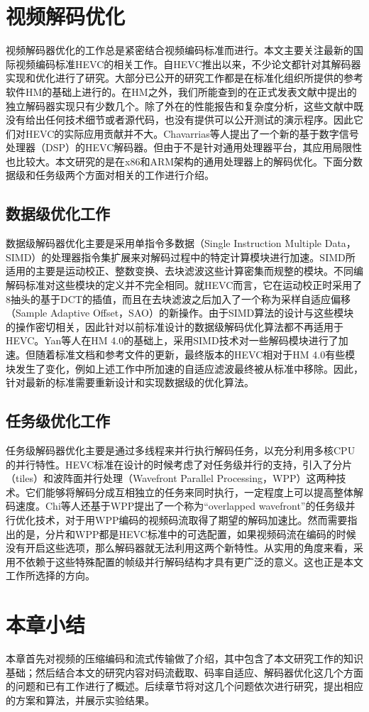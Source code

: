 \section{视频解码优化}

视频解码器优化的工作总是紧密结合视频编码标准而进行。本文主要关注最新的国际视频编码标准HEVC的相关工作。自HEVC推出以来，不少论文都针对其解码器实现和优化进行了研究。大部分已公开的研究工作都是在标准化组织所提供的参考软件HM\supercite{HM}的基础上进行的。在HM之外，我们所能查到的在正式发表文献中提出的独立解码器实现只有少数几个\supercite{Bossen-TCSVT2012,JCTVC-G988,JCTVC-H0693}。除了外在的性能报告和复杂度分析，这些文献中既没有给出任何技术细节或者源代码，也没有提供可以公开测试的演示程序。因此它们对HEVC的实际应用贡献并不大。Chavarrias等人\supercite{Chavarrias-TCE2013}提出了一个新的基于数字信号处理器（DSP）的HEVC解码器。但由于不是针对通用处理器平台，其应用局限性也比较大。本文研究的是在x86和ARM架构的通用处理器上的解码优化。下面分数据级和任务级两个方面对相关的工作进行介绍。

\subsection{数据级优化工作}

数据级解码器优化主要是采用单指令多数据（Single Instruction Multiple Data，SIMD）的处理器指令集扩展来对解码过程中的特定计算模块进行加速。SIMD所适用的主要是运动校正、整数变换、去块滤波这些计算密集而规整的模块。不同编解码标准对这些模块的定义并不完全相同。就HEVC而言，它在运动校正时采用了8抽头的基于DCT的插值\supercite{JCTVC-F537}，而且在去块滤波之后加入了一个称为采样自适应偏移（Sample Adaptive Offset，SAO）的新操作\supercite{Fu-TCSVT2012}。由于SIMD算法的设计与这些模块的操作密切相关，因此针对以前标准设计的数据级解码优化算法\supercite{Casalino-ICMCS1999,Lappalainen-TCSVT2003,Malvar-TCSVT2003,Chen-JVCIR2006,Pescador-TCE2009}都不再适用于HEVC。Yan等人\supercite{Yan-VCIP2012}在HM 4.0的基础上，采用SIMD技术对一些解码模块进行了加速。但随着标准文档和参考文件的更新，最终版本的HEVC相对于HM 4.0有些模块发生了变化，例如上述工作中所加速的自适应滤波\supercite{JCTVC-F303}最终被从标准中移除。因此，针对最新的标准需要重新设计和实现数据级的优化算法。

\subsection{任务级优化工作}

任务级解码器优化主要是通过多线程来并行执行解码任务，以充分利用多核CPU的并行特性。HEVC标准在设计的时候考虑了对任务级并行的支持，引入了分片（tiles）\supercite{JCTVC-E408}和波阵面并行处理（Wavefront Parallel Processing，WPP）\supercite{JCTVC-E196}这两种技术。它们能够将解码分成互相独立的任务来同时执行，一定程度上可以提高整体解码速度。Chi等人\supercite{Chi-TCSVT2012}还基于WPP提出了一个称为“overlapped wavefront”的任务级并行优化技术，对于用WPP编码的视频码流取得了期望的解码加速比。然而需要指出的是，分片和WPP都是HEVC标准中的可选配置，如果视频码流在编码的时候没有开启这些选项，那么解码器就无法利用这两个新特性。从实用的角度来看，采用不依赖于这些特殊配置的帧级并行解码结构才具有更广泛的意义。这也正是本文工作所选择的方向。

\section{本章小结}

本章首先对视频的压缩编码和流式传输做了介绍，其中包含了本文研究工作的知识基础；然后结合本文的研究内容对码流截取、码率自适应、解码器优化这几个方面的问题和已有工作进行了概述。后续章节将对这几个问题依次进行研究，提出相应的方案和算法，并展示实验结果。